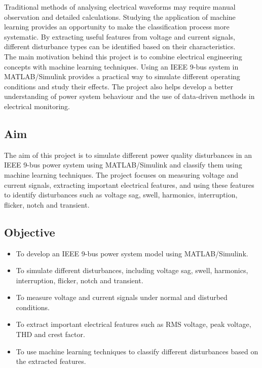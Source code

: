 \documentclass[12pt]{article}
\begin{document}
\begin{center}
Traditional methods of analysing electrical waveforms may require manual observation and detailed calculations. Studying the application of machine learning provides an opportunity to make the classification process more systematic. By extracting useful features from voltage and current signals, different disturbance types can be identified based on their characteristics.\\

The main motivation behind this project is to combine electrical engineering concepts with machine learning techniques. Using an IEEE 9-bus system in MATLAB/Simulink provides a practical way to simulate different operating conditions and study their effects. The project also helps develop a better understanding of power system behaviour and the use of data-driven methods in electrical monitoring.
\subsection{Aim}
\raggedright
\justifying
The aim of this project is to simulate different power quality disturbances in an IEEE 9-bus power system using MATLAB/Simulink and classify them using machine learning techniques. The project focuses on measuring voltage and current signals, extracting important electrical features, and using these features to identify disturbances such as voltage sag, swell, harmonics, interruption, flicker, notch and transient.

\subsection{Objective}
\raggedright
\justifying
\begin{itemize}
    \item To develop an IEEE 9-bus power system model using MATLAB/Simulink.
\end{itemize}
\begin{itemize}
    \item  To simulate different disturbances, including voltage sag, swell, harmonics, interruption, flicker, notch and transient.
\end{itemize}
\begin{itemize}
    \item  To measure voltage and current signals under normal and disturbed conditions.
\end{itemize}
\begin{itemize}
    \item To extract important electrical features such as RMS voltage, peak voltage, THD and crest factor.
\end{itemize}
\begin{itemize}
    \item To use machine learning techniques to classify different disturbances based on the extracted features.
\end{itemize}



\end{center}
\end{document}
